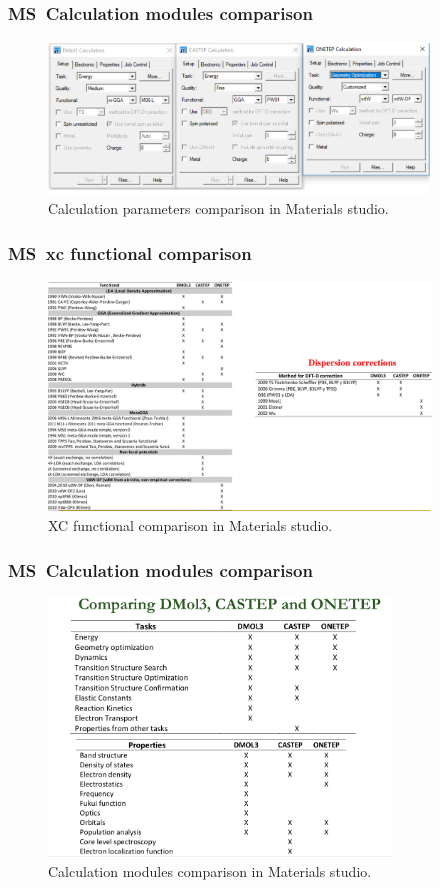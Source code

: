 \frame
{
	\frametitle{\textrm{MS~Calculation modules comparison}}
\begin{figure}[h!]
\centering
\vspace*{-0.10in}
\includegraphics[height=1.60in,width=4.00in,viewport=0 0 1517 602,clip]{Figures/MS-Caluculator-compare-1.png}
\caption{\tiny \textrm{Calculation parameters comparison in Materials studio.}}%
\label{MS-Module_parameters}
\end{figure}
}

\frame
{
	\frametitle{\textrm{MS~xc functional  comparison}}
\begin{figure}[h!]
\centering
\vspace*{-0.15in}
\includegraphics[height=2.40in,width=4.00in,viewport=0 0 1261 751,clip]{Figures/MS-xc_functional-compare.png}
\caption{\tiny \textrm{XC functional comparison in Materials studio.}}%
\label{MS-Module_xc-functional}
\end{figure}
}

\frame
{
	\frametitle{\textrm{MS~Calculation modules comparison}}
\begin{figure}[h!]
\centering
\vspace*{-0.18in}
\includegraphics[height=2.70in,width=3.60in,viewport=0 0 969 728,clip]{Figures/MS-Caluculator-compare-2.png}
\caption{\tiny \textrm{Calculation modules comparison in Materials studio.}}%
\label{MS-Module_xc-functional}
\end{figure}
}

